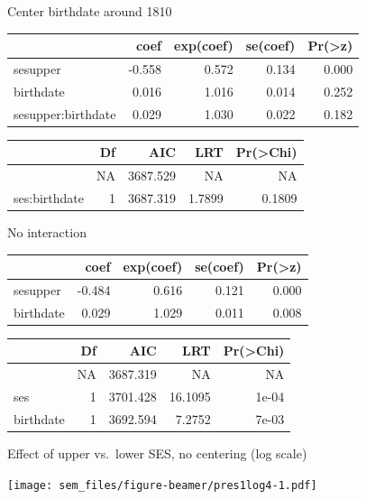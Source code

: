 \begin{frame}[fragile]{Center birthdate around 1810}

\begin{Shaded}
\begin{Highlighting}[]
\StringTok{ }\StringTok{ }
\end{Highlighting}
\end{Shaded}

\begin{longtable}[c]{@{}lrrrr@{}}
\toprule
& coef & exp(coef) & se(coef) &
Pr(\textgreater{}\textbar{}z\textbar{})\tabularnewline
\midrule
\endhead
sesupper & -0.558 & 0.572 & 0.134 & 0.000\tabularnewline
birthdate & 0.016 & 1.016 & 0.014 & 0.252\tabularnewline
sesupper:birthdate & 0.029 & 1.030 & 0.022 & 0.182\tabularnewline
\bottomrule
\end{longtable}

\begin{longtable}[c]{@{}lrrrr@{}}
\toprule
& Df & AIC & LRT & Pr(\textgreater{}Chi)\tabularnewline
\midrule
\endhead
& NA & 3687.529 & NA & NA\tabularnewline
ses:birthdate & 1 & 3687.319 & 1.7899 & 0.1809\tabularnewline
\bottomrule
\end{longtable}

\end{frame}

\begin{frame}{No interaction}

\begin{longtable}[c]{@{}lrrrr@{}}
\toprule
& coef & exp(coef) & se(coef) &
Pr(\textgreater{}\textbar{}z\textbar{})\tabularnewline
\midrule
\endhead
sesupper & -0.484 & 0.616 & 0.121 & 0.000\tabularnewline
birthdate & 0.029 & 1.029 & 0.011 & 0.008\tabularnewline
\bottomrule
\end{longtable}

\begin{longtable}[c]{@{}lrrrr@{}}
\toprule
& Df & AIC & LRT & Pr(\textgreater{}Chi)\tabularnewline
\midrule
\endhead
& NA & 3687.319 & NA & NA\tabularnewline
ses & 1 & 3701.428 & 16.1095 & 1e-04\tabularnewline
birthdate & 1 & 3692.594 & 7.2752 & 7e-03\tabularnewline
\bottomrule
\end{longtable}

\end{frame}

\begin{frame}{Effect of upper vs.~lower SES, no centering (log scale)}

\texttt{[image: sem\_files/figure-beamer/pres1log4-1.pdf]}

\end{frame}

